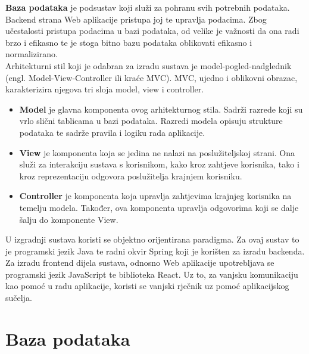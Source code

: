 		
		\textbf{Baza podataka} je podsustav koji služi za pohranu svih potrebnih podataka. Backend strana Web aplikacije pristupa joj te upravlja podacima. Zbog učestalosti pristupa podacima u bazi podataka, od velike je važnosti da ona radi brzo i efikasno te je stoga bitno bazu podataka oblikovati efikasno i normalizirano.\\
		
		Arhitekturni stil koji je odabran za izradu sustava je model-pogled-nadglednik (engl. Model-View-Controller ili kraće MVC). MVC, ujedno i oblikovni obrazac, karakterizira njegova tri sloja model, view i controller.  
		
		\begin{itemize}
			\item \textbf{Model} je glavna komponenta ovog arhitekturnog stila. Sadrži razrede koji su vrlo slični tablicama u bazi podataka. Razredi modela opisuju strukture podataka te sadrže pravila i logiku rada aplikacije.
			\item \textbf{View} je komponenta koja se jedina ne nalazi na poslužiteljskoj strani. Ona služi za interakciju sustava s korisnikom, kako kroz zahtjeve korisnika, tako i kroz reprezentaciju odgovora poslužitelja krajnjem korisniku.
			\item \textbf{Controller} je komponenta koja upravlja zahtjevima krajnjeg korisnika na temelju modela. Također, ova komponenta upravlja odgovorima koji se dalje šalju do komponente View.
		\end{itemize}
		
		
		U izgradnji sustava koristi se objektno orijentirana paradigma. Za ovaj sustav to je programski jezik Java te radni okvir Spring koji je korišten za izradu backenda. Za izradu frontend dijela sustava, odnosno Web aplikacije upotrebljava se programski jezik JavaScript te biblioteka React. Uz to, za vanjsku komunikaciju kao pomoć u radu aplikacije, koristi se vanjski rječnik uz pomoć aplikacijskog sučelja.\\
		
		\newpage

				
		\section{Baza podataka}
			
			
		
